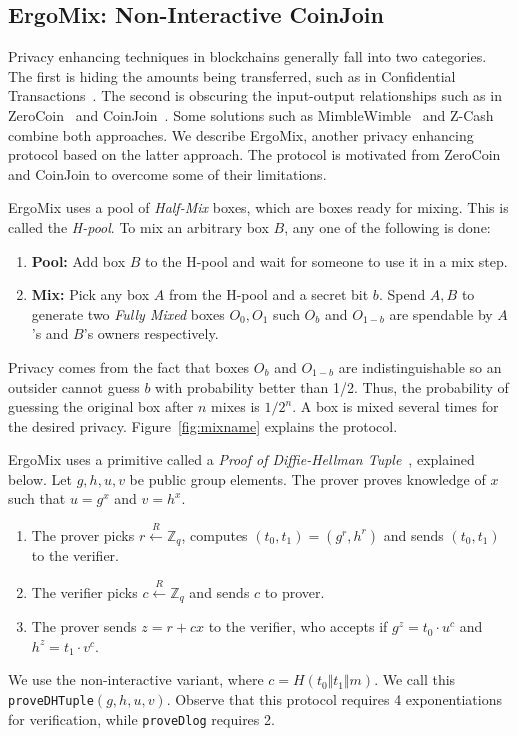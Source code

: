 \documentclass[11pt]{article}
\newcommand{\mixname}{ErgoMix\xspace}
\begin{document}
\subsection{\mixname: Non-Interactive CoinJoin}
\label{mix}

Privacy enhancing techniques in blockchains generally fall into two categories. The first is hiding the amounts being transferred, such as in Confidential Transactions~\cite{ct}. The second is obscuring the input-output relationships such as in ZeroCoin~\cite{zerocoin} and CoinJoin~\cite{coinjoin}. Some solutions such as MimbleWimble~\cite{mw} and Z-Cash~\cite{zcash,zcash1} combine both approaches. We describe \mixname, another privacy enhancing protocol based on the latter approach. The protocol is motivated from ZeroCoin and CoinJoin to overcome some of their limitations.

\mixname uses a pool of {\em Half-Mix} boxes, which are boxes ready for mixing. This is called the {\em H-pool}. 
To mix an arbitrary box $B$, any one of the following is done:
\begin{enumerate}
	\item \textbf{Pool:} Add box $B$ to the H-pool and wait for someone to use it in a mix step.
	\item \textbf{Mix:} Pick any box $A$ from the H-pool and a secret bit $b$. Spend $A, B$ to generate two {\em Fully Mixed} boxes $O_0, O_1$ such $O_b$ and $O_{1-b}$ are spendable by $A$'s and $B$'s owners respectively.
\end{enumerate}

Privacy comes from the fact that boxes $O_b$ and $O_{1-b}$ are indistinguishable so an outsider cannot guess $b$ with probability better than 1/2. Thus, the probability of guessing the original box after $n$ mixes is $1/2^n$. A box is mixed several times for the desired privacy. 
Figure~\ref{fig:mixname} explains the protocol. 

\mixname uses a primitive called a {\em Proof of Diffie-Hellman Tuple}~\cite{CDS94}, explained below. Let $g, h, u, v$ be public group elements. The prover proves knowledge of $x$ such that $u={g}^x$ and $v={h}^x$. 
\begin{enumerate}
	\item The prover picks $r \stackrel{R}{\leftarrow} \mathbb{Z}_q$, computes $(t_0, t_1) = ({g}^r, {h}^r)$ and sends $(t_0, t_1)$ to the verifier.
	\item The verifier picks $c \stackrel{R}{\leftarrow} \mathbb{Z}_q$ and sends $c$ to prover.
	\item The prover sends $z = r + cx$ to the verifier, who accepts if ${g}^z = {t_0}\cdot {u}^c$ and $h^z=t_1\cdot v^c$. 
\end{enumerate}
We use the non-interactive variant, where $c = H(t_0 \Vert t_1\Vert m)$. We call this \texttt{proveDHTuple}$(g, h, u, v)$. Observe that this protocol requires 4 exponentiations for verification, while \texttt{proveDlog} requires 2.
\end{document}
